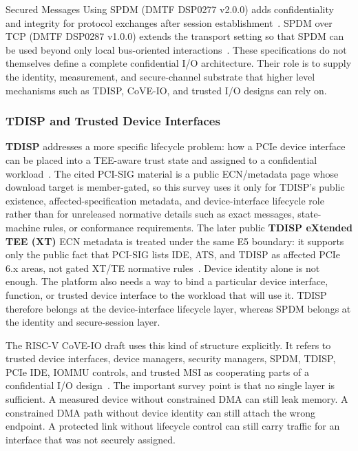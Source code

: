 Secured Messages Using SPDM (DMTF DSP0277 v2.0.0) adds confidentiality and
integrity for protocol exchanges after session
establishment~\cite{dmtf_spdm_secured_messages_2025}. SPDM over TCP (DMTF
DSP0287 v1.0.0) extends the transport setting so that SPDM can be used beyond
only local bus-oriented interactions~\cite{dmtf_spdm_tcp_2024}. These
specifications do not themselves define a complete confidential I/O
architecture. Their role is to supply the identity, measurement, and
secure-channel substrate that higher level mechanisms such as TDISP, CoVE-IO,
and trusted I/O designs can rely on.

\subsubsection{TDISP and Trusted Device Interfaces}

\textbf{TDISP} addresses a more specific lifecycle problem: how a PCIe device
interface can be placed into a TEE-aware trust state and assigned to a
confidential workload~\cite{pcisig_tdisp_2022}. The cited PCI-SIG material is a
public ECN/metadata page whose download target is member-gated, so this survey
uses it only for TDISP's public existence, affected-specification metadata, and
device-interface lifecycle role rather than for unreleased normative details
such as exact messages, state-machine rules, or conformance requirements.
The later public \textbf{TDISP eXtended TEE (XT)} ECN metadata is treated under
the same E5 boundary: it supports only the public fact that PCI-SIG lists IDE,
ATS, and TDISP as affected PCIe 6.x areas, not gated XT/TE normative
rules~\cite{pcisig_tdisp_xt_2025}.
Device identity alone is not enough. The platform also needs a way to bind a
particular device interface, function, or trusted device interface to the
workload that will use it. TDISP therefore belongs at the device-interface
lifecycle layer, whereas SPDM belongs at the identity and secure-session layer.

The RISC-V CoVE-IO draft uses this kind of structure explicitly. It refers to
trusted device interfaces, device managers, security managers, SPDM, TDISP,
PCIe IDE, IOMMU controls, and trusted MSI as cooperating parts of a
confidential I/O design~\cite{riscv_cove_io_2026}. The important survey point
is that no single layer is sufficient. A measured device without constrained
DMA can still leak memory. A constrained DMA path without device identity can
still attach the wrong endpoint. A protected link without lifecycle control can
still carry traffic for an interface that was not securely assigned.

